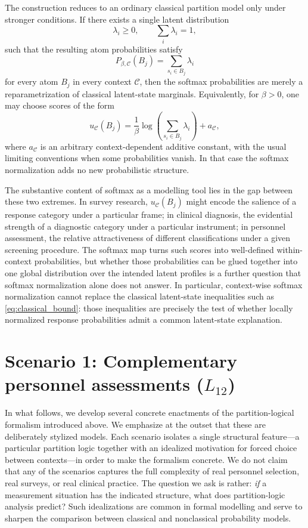 \documentclass{article}
\begin{document}
The construction reduces to an ordinary classical partition model
only under stronger conditions. If there exists a single latent
distribution
\[
\lambda_i\geq 0,\qquad \sum_i\lambda_i=1,
\]
such that the resulting atom probabilities satisfy
\[
P_{\beta,\mathcal C}(B_j)
=
\sum_{s_i\in B_j}\lambda_i
\]
for every atom \(B_j\) in every context \(\mathcal C\), then the
softmax probabilities are merely a reparametrization of classical
latent-state marginals. Equivalently, for \(\beta>0\), one may choose
scores of the form
\[
u_{\mathcal C}(B_j)
=
\frac{1}{\beta}\log\!\left(\sum_{s_i\in B_j}\lambda_i\right)
+
a_{\mathcal C},
\]
where \(a_{\mathcal C}\) is an arbitrary context-dependent additive
constant, with the usual limiting conventions when some probabilities
vanish. In that case the softmax normalization adds no new
probabilistic structure.

The substantive content of softmax as a modelling tool lies in the
gap between these two extremes. In survey research,
\(u_{\mathcal C}(B_j)\) might encode the salience of a response
category under a particular frame; in clinical diagnosis, the
evidential strength of a diagnostic category under a particular
instrument; in personnel assessment, the relative attractiveness of
different classifications under a given screening procedure. The
softmax map turns such scores into well-defined within-context
probabilities, but whether those probabilities can be glued together
into one global distribution over the intended latent profiles is a
further question that softmax normalization alone does not answer. In
particular, context-wise softmax normalization cannot replace the
classical latent-state inequalities such as
\eqref{eq:classical_bound}: those inequalities are precisely the test
of whether locally normalized response probabilities admit a common
latent-state explanation.

\section{Scenario 1: Complementary personnel assessments ($L_{12}$)}
\label{sec:personnel}

In what follows, we develop several concrete enactments of the
partition-logical formalism introduced above. We emphasize at the
outset that these are deliberately stylized models. Each scenario
isolates a single structural feature---a particular partition logic
together with an idealized motivation for forced choice between
contexts---in order to make the formalism concrete. We do not claim
that any of the scenarios captures the full complexity of real
personnel selection, real surveys, or real clinical practice. The
question we ask is rather: \emph{if} a measurement situation has the
indicated structure, what does partition-logic analysis predict?
Such idealizations are common in formal modelling and serve to
sharpen the comparison between classical and nonclassical
probability models.
\end{document}
